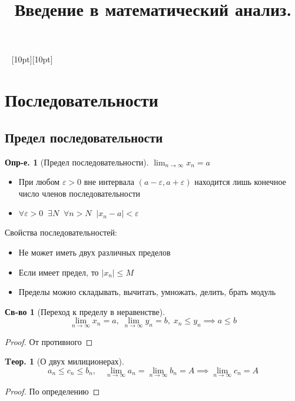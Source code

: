 \documentclass[a4paper,12pt]{article}
\title{Введение в математический анализ.}
\author{}
\date{}
\numberwithin{figure}{section}
\theoremstyle{definition}
\newtheorem{definition}{Опр-е.}[section]
\newtheorem*{property}{Св-во}  %
\theoremstyle{definition}
\newtheorem{theorem}{Tеор.}[section]
\def\DS{\displaystyle}
\def\.{\;\;}
\def\eps{\varepsilon}
\def\ntoinf{n\to\infty}
\def\leqs{\leqslant}
\def\vignette{\vspace{48pt} \noindent \hrulefill~ \raisebox{-8pt}[10pt][10pt]{\Huge\ding{102}}~ \hrulefill}
\begin{document}
\maketitle
\tableofcontents


\vignette
\section{Последовательности}

\subsection{Предел последовательности}

\begin{definition}[Предел последовательности]
	$\DS \lim_{\ntoinf} x_n = a $
	\begin{itemize}
		\item При любом $\eps>0$ вне интервала $(a-\eps,a+\eps)$
			  находится лишь конечное число членов последовательности
		\item $\forall \eps>0 \. \exists N \. \forall n>N \. |x_n - a|<\eps$
	\end{itemize}
\end{definition}
\bigskip

Свойства последовательностей:
\begin{itemize}
	\item Не может иметь двух различных пределов
	\item Если имеет предел, то $|x_n| \leqs M$
	\item Пределы можно складывать, вычитать, умножать, делить, брать модуль
\end{itemize}
\bigskip

\begin{property}[Переход к пределу в неравенстве]
\[ \lim_{\ntoinf}x_n=a ,\; \lim_{\ntoinf}y_n=b ,\; x_n \leqs y_n
   \implies a \leqs b \]
\end{property}
\begin{proof} От противного \end{proof}
\bigskip

\begin{theorem}[О двух милиционерах]
	\[ a_n \leqs c_n \leqs b_n , \quad
	   \lim_{\ntoinf}a_n = \lim_{\ntoinf}b_n = A
	   \implies \lim_{\ntoinf}c_n = A \]
\end{theorem}
\begin{proof} По определению \end{proof}
\end{document}
